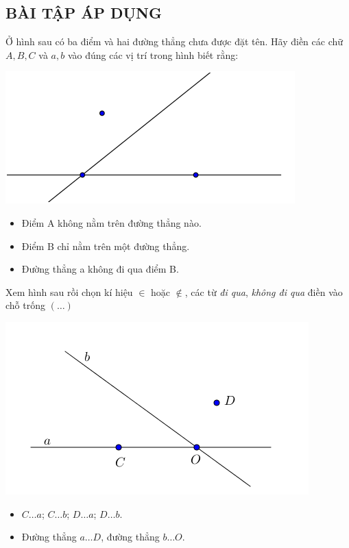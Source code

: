 \subsection{BÀI TẬP ÁP DỤNG}
\begin{bt}
Ở hình sau có ba điểm và hai đường thẳng chưa được đặt tên. Hãy điền các chữ $A, B, C$ và $a, b$ vào đúng các vị trí trong hình biết rằng:
\begin{center}
\includegraphics[scale=0.6]{img/bai1_c1}
\end{center}

\begin{itemize}
\item Điểm A không nằm trên đường thẳng nào.
\item Điểm B chỉ nằm trên một đường thẳng.
\item Đường thẳng a không đi qua điểm B. 
\end{itemize}
\end{bt}   \begin{bt}
Xem hình sau rồi chọn kí hiệu $\in$ hoặc $\notin$, các từ \textit{đi qua}, \textit{không đi qua} điền vào chỗ trống $(\dots)$
\begin{center}
\includegraphics[scale=0.65]{img/bai2_c1}
\end{center}
\begin{itemize}
\item $C \dots a$; $C \dots b$; $D \dots a$; $D \dots b$.
\item  Đường thẳng $a \dots D$, đường thẳng $b \dots O$.                 
\end{itemize}
\end{bt}   
